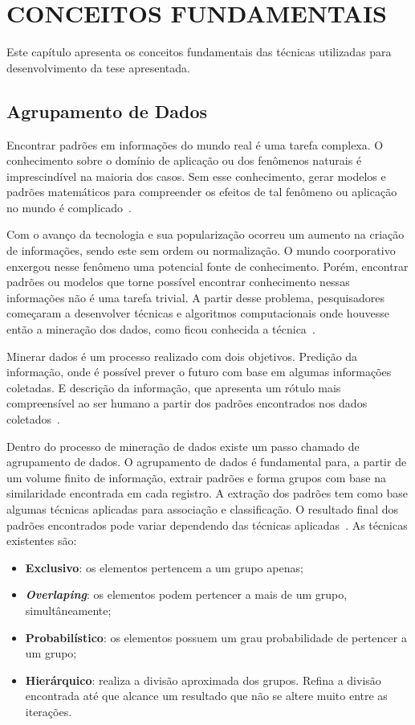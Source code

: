 \chapter{CONCEITOS FUNDAMENTAIS}
\label{cap:ai}
Este capítulo apresenta os conceitos fundamentais das técnicas utilizadas para desenvolvimento da tese apresentada.

\section{Agrupamento de Dados}
\label{sec:clustering}
Encontrar padrões em informações do mundo real é uma tarefa complexa. O conhecimento sobre o domínio de aplicação ou dos fenômenos naturais é imprescindível na maioria dos casos. Sem esse conhecimento, gerar modelos e padrões matemáticos para compreender os efeitos de tal fenômeno ou aplicação no mundo é complicado~\cite{kantardzic:2011}.

Com o avanço da tecnologia e sua popularização ocorreu um aumento na criação de informações, sendo este sem ordem ou normalização. O mundo coorporativo enxergou nesse fenômeno uma potencial fonte de conhecimento. Porém, encontrar padrões ou modelos que torne possível encontrar conhecimento nessas informações não é uma tarefa trivial. A partir desse problema, pesquisadores começaram a desenvolver técnicas e algoritmos computacionais onde houvesse então a mineração dos dados, como ficou conhecida a técnica~\cite{jain:1999, kantardzic:2011}.

Minerar dados é um processo realizado com dois objetivos. Predição da informação, onde é possível prever o futuro com base em algumas informações coletadas. E descrição da informação, que apresenta um rótulo mais compreensível ao ser humano a partir dos padrões encontrados nos dados coletados~\cite{jain:1999}.

Dentro do processo de mineração de dados existe um passo chamado de agrupamento de dados. O agrupamento de dados é fundamental para, a partir de um volume finito de informação, extrair padrões e forma grupos com base na similaridade encontrada em cada registro. A extração dos padrões tem como base algumas técnicas aplicadas para associação e classificação. O resultado final dos padrões encontrados pode variar dependendo das técnicas aplicadas~\cite{kantardzic:2011, witten:2011}. As técnicas existentes são:

\begin{itemize}
    \item \textbf{Exclusivo}: os elementos pertencem a um grupo apenas;
    \item \textbf{\emph{Overlaping}}: os elementos podem pertencer a mais de um grupo, simultâneamente;
    \item \textbf{Probabilístico}: os elementos possuem um grau probabilidade de pertencer a um grupo;
    \item \textbf{Hierárquico}: realiza a divisão aproximada dos grupos. Refina a divisão encontrada até que alcance um resultado que não se altere muito entre as iterações.
\end{itemize}

